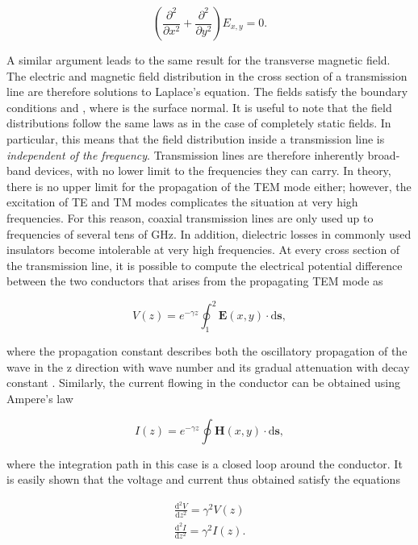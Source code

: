 \begin{equation}
\left(\frac{\partial^2}{\partial x^2}+ \frac{\partial^2}{\partial y^2}\right) E_{x,y} = 0.
\end{equation}

A similar argument leads to the same result for the transverse magnetic
field. The electric and magnetic field distribution in the cross section
of a transmission line are therefore solutions to Laplace's equation.
The fields satisfy the boundary conditions
 and ,
where  is the surface normal. It is useful to note that
the field distributions follow the same laws as in the case of
completely static fields. In particular, this means that the field
distribution inside a transmission line is
\textit{independent of the frequency}. Transmission lines are therefore
inherently broad-band devices, with no lower limit to the frequencies
they can carry. In theory, there is no upper limit for the propagation
of the TEM mode either; however, the excitation of TE and TM modes
complicates the situation at very high frequencies. For this reason,
coaxial transmission lines are only used up to frequencies of several
tens of GHz. In addition, dielectric losses in commonly used insulators
become intolerable at very high frequencies. At every cross section of
the transmission line, it is possible to compute the electrical
potential difference between the two conductors that arises from the
propagating TEM mode as

\begin{equation}
V(z) = e^{-\gamma z}\oint_1^2 \mathbf{E}(x,y)\cdot \mathrm{d}\mathbf{s},
\end{equation}

where the propagation constant  describes both
the oscillatory propagation of the wave in the z direction with wave
number  and its gradual attenuation with decay constant \m{\alpha}.
Similarly, the current flowing in the conductor can be obtained using
Ampere's law

\begin{equation}
I(z) = e^{-\gamma z} \oint \mathbf{H}(x,y)\cdot \mathrm{d}\mathbf{s},
\end{equation}

where the integration path in this case is a closed loop around the
conductor. It is easily shown that the voltage and current thus obtained
satisfy the equations

\begin{eqnarray}
\frac{\mathrm{d}^2 V}{\mathrm{d}z^2} = \gamma^2 V(z) \\
\frac{\mathrm{d}^2 I}{\mathrm{d}z^2} = \gamma^2 I(z).
\end{eqnarray}

